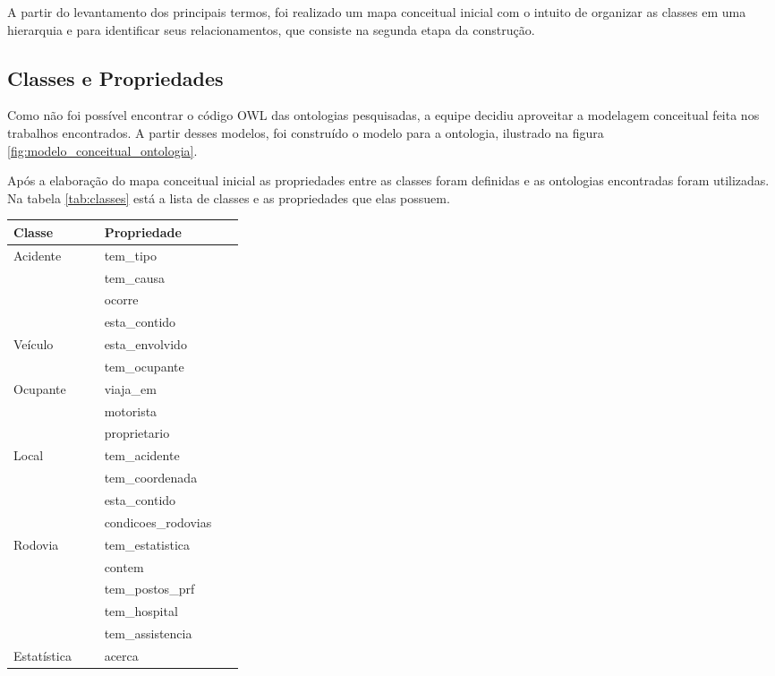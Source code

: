       A partir do levantamento dos principais termos, foi realizado um mapa conceitual inicial com o intuito
      de organizar as classes em uma hierarquia e para identificar seus relacionamentos, que consiste na segunda
      etapa da construção.

      \subsection{Classes e Propriedades}
      
	  Como não foi possível encontrar o código OWL das ontologias pesquisadas, a equipe decidiu aproveitar a
	  modelagem conceitual feita nos trabalhos encontrados. A partir desses modelos, foi construído o modelo 
	  para a ontologia, ilustrado na figura \ref{fig:modelo_conceitual_ontologia}.
	  
	  Após a elaboração do mapa conceitual inicial as propriedades entre as classes foram definidas e as ontologias
	  encontradas foram utilizadas. 
	  Na tabela \ref{tab:classes} está a lista de classes e as propriedades que elas possuem.      

	  \begin{table*}[!h]
	  \centering
	  \begin{tabular}{p{0.15\linewidth}p{0.15\linewidth}}
	    \hline
	    \textbf{Classe} & \textbf{Propriedade} \\
	    \hline
	      Acidente & tem\_tipo\\
		& tem\_causa\\
		& ocorre\\
		& esta\_contido\\
	    \hline
	      Veículo & esta\_envolvido\\
		& tem\_ocupante\\
	    \hline
	      Ocupante & viaja\_em\\
		& motorista\\
		& proprietario\\
	    \hline
	      Local & tem\_acidente\\
		& tem\_coordenada\\
		& esta\_contido\\
		& condicoes\_rodovias\\
	    \hline
	      Rodovia & tem\_estatistica\\
		& contem\\
		& tem\_postos\_prf\\
		& tem\_hospital\\
		& tem\_assistencia\\
	    \hline
	      Estatística & acerca\\
	    \hline
	  \end{tabular}
	  \caption{Classes e Propriedades}
	  \label{tab:classes}
	  \end{table*}
	  
